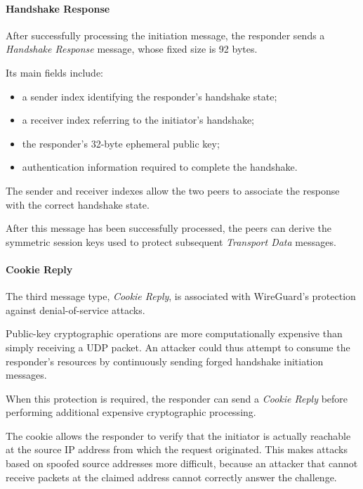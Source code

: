 \paragraph{Handshake Response}

After successfully processing the initiation message, the responder sends a \textit{Handshake Response} message, whose fixed size is 92 bytes.

Its main fields include:

\begin{itemize}
	\item a sender index identifying the responder's handshake state;
	\item a receiver index referring to the initiator's handshake;
	\item the responder's 32-byte ephemeral public key;
	\item authentication information required to complete the handshake.
\end{itemize}

The sender and receiver indexes allow the two peers to associate the response with the correct handshake state.

After this message has been successfully processed, the peers can derive the symmetric session keys used to protect subsequent \textit{Transport Data} messages.

\paragraph{Cookie Reply}

The third message type, \textit{Cookie Reply}, is associated with WireGuard's protection against denial-of-service attacks.

Public-key cryptographic operations are more computationally expensive than simply receiving a UDP packet. An attacker could thus attempt to consume the responder's resources by continuously sending forged handshake initiation messages.

When this protection is required, the responder can send a \textit{Cookie Reply} before performing additional expensive cryptographic processing.

The cookie allows the responder to verify that the initiator is actually reachable at the source IP address from which the request originated. This makes attacks based on spoofed source addresses more difficult, because an attacker that cannot receive packets at the claimed address cannot correctly answer the challenge.

